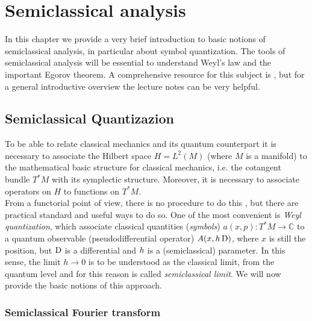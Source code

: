 
\chapter{Semiclassical analysis} %

\label{Chapter2} %
\thispagestyle{empty}

In this chapter we provide a very brief introduction to basic notions of semiclassical analysis, in particular about symbol quantization. The tools of semiclassical analysis will be essential to understand Weyl's law and the important Egorov theorem. A comprehensive resource for this subject is \cite{Zworski:semic}, but for a general introductive overview the lecture notes \cite{Semy:lec_semi} can be very helpful.


\section{Semiclassical Quantizazion}

To be able to relate classical mechanics and its quantum counterpart it is necessary to associate the Hilbert space $H=L^{2}(M)$ (where $M$ is a manifold) to the mathematical basic structure for classical mechanics, i.e. the cotangent bundle $T^{\ast}M$ with its symplectic structure. Moreover, it is necessary to associate operators on $H$ to functions on $T^{\ast}M$.\\
From a functorial  point of view, there is no procedure to do this \cite{Hove:noFunc}, but there are practical standard and useful ways to do so. One of the most convenient is \emph{Weyl quantization}, which associate classical quantities (\emph{symbols}) $a(x,p)\colon T^{\ast}M\to\mathbb{C}$ to a quantum observable (pseudodifferential operator) $A(x,h\operatorname{D})$, where $x$ is still the position, but $\operatorname{D}$ is a differential and $h$ is a (semiclassical) parameter. In this sense, the limit $h\to0$ is to be understood as the classical limit, from the quantum level and for this reason is called \emph{semiclassical limit}. We will now provide the basic notions of this approach.



\subsection{Semiclassical Fourier transform}

